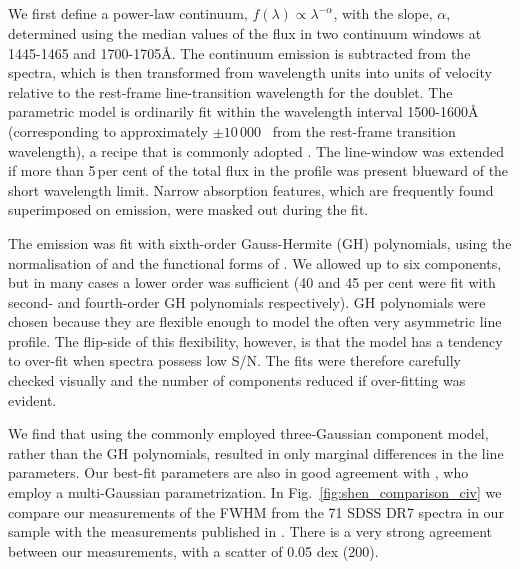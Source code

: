 \subsection{}
\label{sec:civ}

We first define a power-law continuum, $f(\lambda) \propto \lambda^{-\alpha}$, with the slope, $\alpha$, determined using the median values of the flux in two continuum windows at 1445-1465 and 1700-1705\AA. 
The continuum emission is subtracted from the spectra, which is then transformed from wavelength units into units of velocity relative to the rest-frame line-transition wavelength for the  doublet.
The parametric model is ordinarily fit within the wavelength interval 1500-1600\AA\, (corresponding to approximately $\pm 10\,000$ \kms\, from the rest-frame transition wavelength), a recipe that is commonly adopted \citep[e.g.][]{denney13}. 
The line-window was extended if more than 5\,per cent of the total flux in the profile was present blueward of the short wavelength limit. 
Narrow absorption features, which are frequently found superimposed on  emission, were masked out during the fit. 

The  emission was fit with sixth-order Gauss-Hermite (GH) polynomials, using the normalisation of \citet{marel93} and the functional forms of \citet{cappellari02}. 
We allowed up to six components, but in many cases a lower order was sufficient (40 and 45 per cent were fit with second- and fourth-order GH polynomials respectively).
GH polynomials were chosen because they are flexible enough to model the often very asymmetric  line profile. 
The flip-side of this flexibility, however, is that the model has a tendency to over-fit when spectra possess low S/N. 
The fits were therefore carefully checked visually and the number of components reduced if over-fitting was evident.

We find that using the commonly employed three-Gaussian component model, rather than the GH polynomials, resulted in only marginal differences in the line parameters. 
Our best-fit parameters are also in good agreement with \citet{shen11}, who employ a multi-Gaussian parametrization. 
In Fig.~\ref{fig:shen_comparison_civ} we compare our measurements of the  FWHM from the 71 SDSS DR7 spectra in our sample with the measurements published in \citet{shen11}. 
There is a very strong agreement between our measurements, with a scatter of 0.05 dex (200\kms). 

